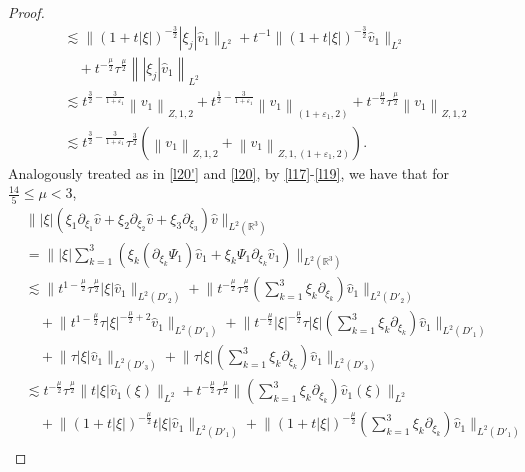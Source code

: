\documentclass[11pt,twoside]{article}
\newcommand{\R}{\mathbb R}
\newcommand{\p}{\partial}
\newcommand{\f}{\frac}
\theoremstyle{plain}
\theoremstyle{definition}
\theoremstyle{remark}
\numberwithin{equation}{section}
\begin{document}
\begin{proof}
\begin{equation}\label{l23}
\begin{aligned}
& \lesssim \big\|(1+t|\xi|)^{-\f32}|\xi_j| \hat{v}_1\big\|_{L^2}+t^{-1}\big\|(1+t|\xi|)^{-\f32} \hat{v}_1\big\|_{L^2}\\
&\quad +t^{-\frac{\mu}{2}} \tau^{\frac{\mu}{2}} \left\||\xi_j|\hat{v}_1\right\|_{L^2} \\
& \lesssim t^{\f32-\frac{3}{1+\varepsilon_1}} \left\|v_1\right\|_{Z, 1, 2}+ t^{\f12-\frac{3}{1+\varepsilon_1}}\left\|v_1\right\|_{\left(1+\varepsilon_1, 2\right)}+t^{-\f{\mu}{2}} \tau^{\f{\mu}{2}}\left\|v_1\right\|_{Z, 1, 2} \\
& \lesssim t^{\f32-\frac{3}{1+\varepsilon_1}} \tau^{\f32}(\left\|v_1\right\|_{Z, 1, 2}+\left\|v_1\right\|_{Z, 1, \left(1+\varepsilon_1, 2\right)}).
\end{aligned}
\end{equation}
Analogously treated as in \eqref{l20'} and \eqref{l20}, by \eqref{l17}-\eqref{l19}, we have that for $\f{14}{5}\leq\mu<3$,
\begin{equation}\label{l24'}
\begin{aligned}
&\big\||\xi|(\xi_1\p_{\xi_1}\hat{v}+\xi_2\p_{\xi_2}\hat{v}+\xi_3\p_{\xi_3})\hat{v}\big\|_{L^2(\R^3)}
\\
&=\big\||\xi|  \sum_{k=1}^{3}\left(
 \xi_k (\partial_{\xi_k} \Psi_1) \hat{v}_1
+ \xi_k \Psi_1 \partial_{\xi_k} \hat{v}_1\right)\big\|_{L^2(\R^3)}\\
&\lesssim \big\|t^{1-\frac{\mu}{2}}\tau^{\f{\mu}{2}}|\xi|\hat{v}_{1}\big\|_{L^{2}(D'_2)}+ \big\|t^{-\f{\mu}{2}}\tau^{\f{\mu}{2}}(\sum_{k=1}^3\xi_k\p_{\xi_k})\hat{v}_{1}\big\|_{L^{2}(D'_2)}\\
&\quad+ \big\|t^{1-\frac{\mu}{2}}\tau|\xi|^{-\f{\mu}{2}+2}\hat{v}_{1}\big\|_{L^{2}(D'_1)}+ \big\|t^{-\frac{\mu}{2}}|\xi|^{-\frac{\mu}{2}}\tau|\xi|(\sum_{k=1}^3\xi_k\p_{\xi_k})\hat{v}_{1}\big\|_{L^{2}(D'_1)}\\
&\quad+ \big\|\tau|\xi|\hat{v}_{1}\big\|_{L^{2}(D'_3)}+ \big\|\tau|\xi|(\sum_{k=1}^3\xi_k\p_{\xi_k})\hat{v}_{1}\big\|_{L^{2}(D'_3)}\\
& \lesssim t^{-\frac{\mu}{2}}\tau^{\frac{\mu}{2}}\big\| t|\xi|  \hat{v}_1(\xi)\big\|_{L^2}+t^{-\frac{\mu}{2}}\tau^{\frac{\mu}{2}}\big\| (\sum_{k=1}^3\xi_k\p_{\xi_k})  \hat{v}_1(\xi)\big\|_{L^2}\\
&\quad+ \big\|(1+t|\xi|)^{-\frac{\mu}{2}}t|\xi|\hat{v}_{1}\big\|_{L^{2}(D'_1)}+ \big\|(1+t|\xi|)^{-\frac{\mu}{2}}(\sum_{k=1}^3\xi_k\p_{\xi_k})\hat{v}_{1}\big\|_{L^{2}(D'_1)}\\

\end{aligned}
\end{equation}
\end{proof}
\end{document}
